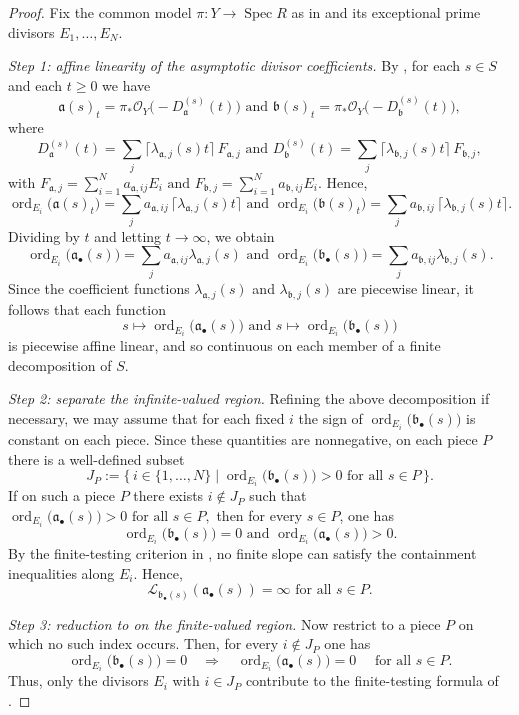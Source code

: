 \documentclass[12pt]{amsart}
\newcommand{\ord}{\operatorname{\mathrm{ord}}}
\renewcommand{\a}{\mathfrak{a}}
\renewcommand{\b}{\mathfrak{b}}
\newcommand{\cO}{\mathcal{O}}
\newcommand{\Loj}{\mathcal{L}} %
\DeclareMathOperator{\Spec}{Spec}
\newcommand{\abul}{{\a_\bullet}}
\newcommand{\bbul}{{\b_\bullet}}
\theoremstyle{plain}
\theoremstyle{definition}
\numberwithin{equation}{section}
\begin{document}
\begin{proof}
	Fix the common model $\pi:Y\to\Spec R$ as in  and its exceptional prime divisors $E_1,\dots,E_N$.
	
	\smallskip\noindent
	\emph{Step 1: affine linearity of the asymptotic divisor coefficients.}
	By , for each $s\in S$ and each $t\ge0$ we have
	\[
	\a(s)_t=\pi_*\cO_Y\bigl(-D^{(s)}_\a(t)\bigr) \text{ and }
	\b(s)_t=\pi_*\cO_Y\bigl(-D^{(s)}_\b(t)\bigr),
	\]
	where
	\[
	D^{(s)}_\a(t)=\sum_j \lceil \lambda_{\a,j}(s)t\rceil\,F_{\a,j} \text{ and }
	D^{(s)}_\b(t)=\sum_j \lceil \lambda_{\b,j}(s)t\rceil\,F_{\b,j},
	\]
with $F_{\a,j}=\sum_{i=1}^N a_{\a,ij}E_i \text{ and } F_{\b,j}=\sum_{i=1}^N a_{\b,ij}E_i.$
	Hence,
	\[
	\ord_{E_i}\bigl(\a(s)_t\bigr)=\sum_j a_{\a,ij}\,\lceil \lambda_{\a,j}(s)t\rceil \text{ and }
	\ord_{E_i}\bigl(\b(s)_t\bigr)=\sum_j a_{\b,ij}\,\lceil \lambda_{\b,j}(s)t\rceil.
	\]
	Dividing by $t$ and letting $t\to\infty$, we obtain
	\[
	\ord_{E_i}\bigl(\abul(s)\bigr)=\sum_j a_{\a,ij}\lambda_{\a,j}(s) \text{ and }
	\ord_{E_i}\bigl(\bbul(s)\bigr)=\sum_j a_{\b,ij}\lambda_{\b,j}(s).
	\]
	Since the coefficient functions $\lambda_{\a,j}(s)$ and $\lambda_{\b,j}(s)$ are piecewise linear,
	it follows that each function
	\[
	s\longmapsto \ord_{E_i}\bigl(\abul(s)\bigr) \text{ and }
	s\longmapsto \ord_{E_i}\bigl(\bbul(s)\bigr)
	\]
	is piecewise affine linear, and so continuous on each member of a finite decomposition of $S$.
	
	\smallskip\noindent
	\emph{Step 2: separate the infinite-valued region.}
	Refining the above decomposition if necessary, we may assume that for each fixed $i$ the sign of $\ord_{E_i}\bigl(\bbul(s)\bigr)$
	is constant on each piece. Since these quantities are nonnegative, on each piece $P$ there is a well-defined subset
	\[
	J_P:=\bigl\{\,i\in\{1,\dots,N\}\mid \ord_{E_i}\bigl(\bbul(s)\bigr)>0
	\text{ for all } s\in P\,\bigr\}.
	\]
	If on such a piece $P$ there exists $i\notin J_P$ such that $\ord_{E_i}\bigl(\abul(s)\bigr)>0 \text{ for all } s\in P,$
	then for every $s\in P$, one has
	\[
	\ord_{E_i}\bigl(\bbul(s)\bigr)=0 \text{ and }
	\ord_{E_i}\bigl(\abul(s)\bigr)>0.
	\]
	By the finite-testing criterion in , no finite slope can satisfy the containment inequalities along $E_i$. Hence,
	\[
	\Loj_{\bbul(s)}(\abul(s))=\infty \text{ for all } s\in P.
	\]
	
	\smallskip\noindent
	\emph{Step 3: reduction to  on the finite-valued region.}
	Now restrict to a piece $P$ on which no such index occurs. Then, for every $i\notin J_P$ one has
	\[
	\ord_{E_i}\bigl(\bbul(s)\bigr)=0 \quad \Longrightarrow \quad \ord_{E_i}\bigl(\abul(s)\bigr)=0 \quad \text{ for all } s\in P.
	\]
	Thus, only the divisors $E_i$ with $i\in J_P$ contribute to the finite-testing formula of
	. 
	

\end{proof}
\end{document}
